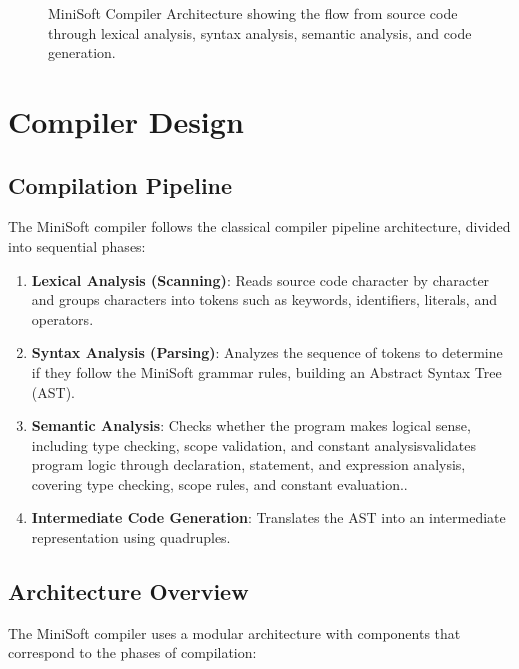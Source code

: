 \documentclass[12pt,a4paper]{article}
\begin{document}
\begin{figure}[H]
	\centering
	\caption{MiniSoft Compiler Architecture showing the flow from source code through lexical analysis, syntax analysis, semantic analysis, and code generation.}
	\label{fig:compiler-architecture}
\end{figure}

\section{Compiler Design}
\subsection{Compilation Pipeline}
The MiniSoft compiler follows the classical compiler pipeline architecture, divided into sequential phases:

\begin{enumerate}
	\item \textbf{Lexical Analysis (Scanning)}: Reads source code character by character and groups characters into tokens such as keywords, identifiers, literals, and operators.

	\item \textbf{Syntax Analysis (Parsing)}: Analyzes the sequence of tokens to determine if they follow the MiniSoft grammar rules, building an Abstract Syntax Tree (AST).

	\item \textbf{Semantic Analysis}: Checks whether the program makes logical sense, including type checking, scope validation, and constant analysisvalidates program logic through declaration, statement, and expression analysis, covering type checking, scope rules, and constant evaluation..

	\item \textbf{Intermediate Code Generation}: Translates the AST into an intermediate representation using quadruples.
\end{enumerate}

\subsection{Architecture Overview}
The MiniSoft compiler uses a modular architecture with components that correspond to the phases of compilation:
\end{document}
